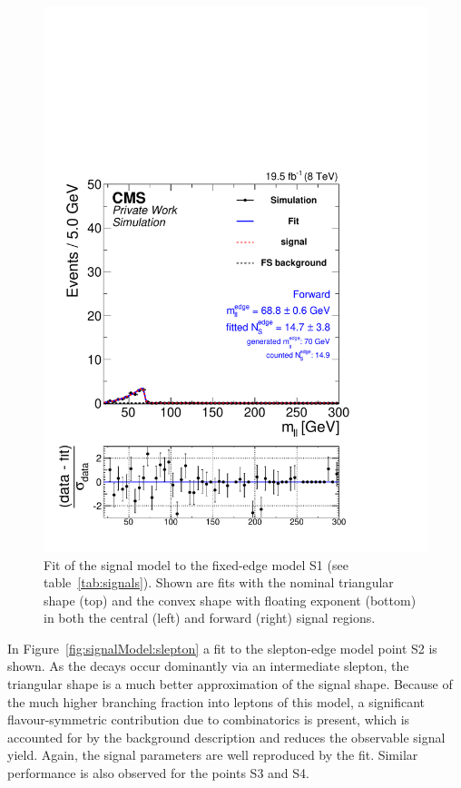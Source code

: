 \begin{figure}[hbp]
\begin{minipage}[t]{0.49\textwidth}
    \includegraphics[width=\textwidth]{plots/results/fit/mcFits/shapeIllustrationKX4_SignalInclusive_Combined_Full2012_KX4_MC_edge_400_150_80_Forward.pdf}
  \end{minipage}
  \caption{Fit of the signal model to the fixed-edge model S1 (see table~\ref{tab:signals}). Shown are fits with the nominal triangular shape (top) and the convex shape with floating exponent (bottom) in both the central (left) and forward (right) signal regions.}
  \label{fig:signalModel:edge}
\end{figure}

In Figure~\ref{fig:signalModel:slepton} a fit to the slepton-edge model point S2 is shown. As the decays occur dominantly via an intermediate slepton, the triangular shape is a much better approximation of the signal shape. Because of the much higher branching fraction into leptons of this model, a significant flavour-symmetric contribution due to combinatorics is present, which is accounted for by the background description and reduces the observable signal yield. Again, the signal parameters are well reproduced by the fit. Similar performance is also observed for the points S3 and S4. 

